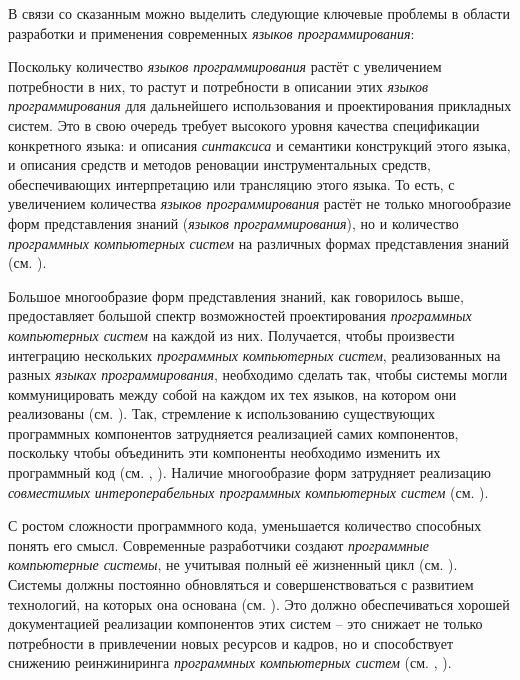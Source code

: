 В связи со сказанным можно выделить следующие ключевые проблемы в области разработки и применения современных \textit{языков программирования}:
\begin{textitemize}
    \item Поскольку количество \textit{языков программирования} растёт с увеличением потребности в них, то растут и потребности в описании этих \textit{языков программирования} для дальнейшего использования и проектирования прикладных систем. Это в свою очередь требует высокого уровня качества спецификации конкретного языка: и описания \textit{синтаксиса} и семантики конструкций этого языка, и описания средств и методов реновации инструментальных средств, обеспечивающих интерпретацию или трансляцию этого языка. То есть, с увеличением количества \textit{языков программирования} растёт не только многообразие форм представления знаний (\textit{языков программирования}), но и количество \textit{программных компьютерных систем} на различных формах представления знаний (см. ).
    \item Большое многообразие форм представления знаний, как говорилось выше, предоставляет большой спектр возможностей проектирования \textit{программных компьютерных систем} на каждой из них. Получается, чтобы произвести интеграцию нескольких \textit{программных компьютерных систем}, реализованных на разных \textit{языках программирования}, необходимо сделать так, чтобы системы могли коммуницировать между собой на каждом их тех языков, на котором они реализованы (см. ). Так, стремление к использованию существующих программных компонентов затрудняется реализацией самих компонентов, поскольку чтобы объединить эти компоненты необходимо изменить их программный код (см. , ). Наличие многообразие форм затрудняет реализацию \textit{совместимых интероперабельных программных компьютерных систем} (см. ).
    \item С ростом сложности программного кода, уменьшается количество способных понять его смысл. Современные разработчики создают \textit{программные компьютерные системы}, не учитывая полный её жизненный цикл (см. ). Системы должны постоянно обновляться и совершенствоваться с развитием технологий, на которых она основана (см. ). Это должно обеспечиваться хорошей документацией реализации компонентов этих систем -- это снижает не только потребности в привлечении новых ресурсов и кадров, но и способствует снижению реинжиниринга \textit{программных компьютерных систем} (см. , ).

\end{textitemize}
